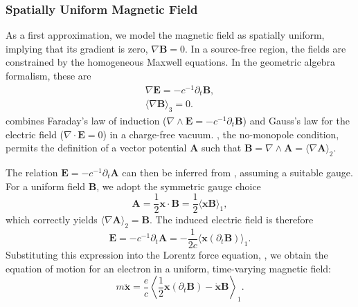 \subsubsection{Spatially Uniform Magnetic Field}
\label{ssub:UniformMagneticField}

As a first approximation, we model the magnetic field as spatially uniform,
implying that its gradient is zero, $\nabla \boldsymbol{B} = 0$. In a
source-free region, the fields are constrained by the homogeneous Maxwell
equations. In the geometric algebra formalism, these are
\begin{gather}
	\label{eq:faraday-gauss}
	\nabla \boldsymbol{E} = -c^{-1} \partial_t \boldsymbol{B},
	\\
	\label{eq:no-monopoles}
	\langle \nabla \boldsymbol{B} \rangle_{3} = 0.
\end{gather}
 combines Faraday's law of induction
($\nabla \wedge \boldsymbol{E} = -c^{-1}\partial_t \boldsymbol{B}$) and Gauss's
law for the electric field ($\nabla \cdot \boldsymbol{E} = 0$) in a
charge-free vacuum. , the no-monopole condition,
permits the definition of a vector potential $\boldsymbol{A}$ such that
$\boldsymbol{B} = \nabla \wedge \boldsymbol{A} =
\langle \nabla \boldsymbol{A} \rangle_{2}$.

The relation $\boldsymbol{E} = -c^{-1}\partial_t \boldsymbol{A}$ can then be
inferred from , assuming a suitable gauge. For a
uniform field $\boldsymbol{B}$, we adopt the symmetric gauge choice
\begin{equation}
	\boldsymbol{A} = \frac{1}{2} \boldsymbol{x} \cdot \boldsymbol{B}
	= \frac{1}{2} \langle \boldsymbol{x} \boldsymbol{B} \rangle_{1},
	\label{eq:vector-potential}
\end{equation}
which correctly yields $\langle \nabla \boldsymbol{A} \rangle_{2} =
\boldsymbol{B}$. The induced electric field is therefore
\begin{equation}
	\boldsymbol{E} = -c^{-1}\partial_t \boldsymbol{A}
	= -\frac{1}{2c} \langle \boldsymbol{x} (\partial_t \boldsymbol{B}) \rangle_{1}.
\end{equation}
Substituting this expression into the Lorentz force equation,
, we obtain the equation of motion for an electron in a
uniform, time-varying magnetic field:
\begin{equation}
	m \ddot{\boldsymbol{x}} = \frac{e}{c} \left\langle \frac{1}{2}
		\boldsymbol{x} (\partial_t \boldsymbol{B}) - \dot{\boldsymbol{x}}
	\boldsymbol{B} \right\rangle_{1}.
	\label{eq:eom-uniform-b}
\end{equation}

